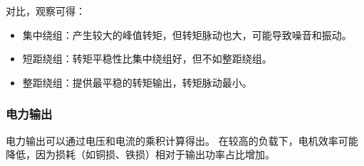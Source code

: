 \documentclass{thuemp}
\begin{document}
对比，观察可得：
\begin{itemize}
	\item 集中绕组：产生较大的峰值转矩，但转矩脉动也大，可能导致噪音和振动。
	\item 短距绕组：转矩平稳性比集中绕组好，但不如整距绕组。
	\item 整距绕组：提供最平稳的转矩输出，转矩脉动最小。
\end{itemize}


\subsubsection{电力输出}

电力输出可以通过电压和电流的乘积计算得出。
在较高的负载下，电机效率可能降低，因为损耗（如铜损、铁损）相对于输出功率占比增加。
\end{document}
